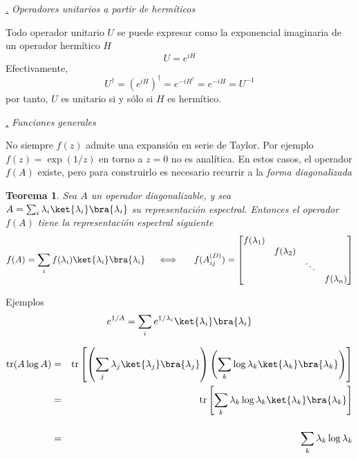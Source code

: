 \documentclass[a4paper,11pt]{book} %
\newtheorem{teorema_contador}{Teorema}
\newcommand{\Teorema}[1]{
		\begin{mybox_gray2}{}
			\begin{teorema_contador}
				 #1 
			\end{teorema_contador} 
		\end{mybox_gray2}
	}
\numberwithin{equation}{chapter}
\def\subsubiContadorIt{\par\addtocounter{subsubsection}{1}\underline{\it\thesubsubsection.}\hskip0.5cm \setcounter{subsubsubsectionIt}{0}}
\newcommand{\SubsubiIt}[1]{
		\subsubiContadorIt \textit{#1}
	}
\newcounter{subsubsubsectionIt}[subsubsection]
\begin{document}
			\SubsubiIt{Operadores unitarios a partir de hermíticos}

Todo operador unitario $U$ se puede expresar como la exponencial imaginaria de un operador hermítico $H$
	\begin{equation}
	U = e^{i H}
	\end{equation}
Efectivamente, 
	\begin{equation}
	U^\dagger = \left(e^{i H}\right)^\dagger = e^{-i H^\dagger} = e^{-i H}=U^{-1}
	\end{equation}
por tanto, $U$ es unitario si y sólo si $H$ es hermítico.


			\SubsubiIt{Funciones generales}

No siempre $f(z)$ admite una expansión en serie de Taylor. Por ejemplo $f(z) = \exp(1/z)$ en torno a $z=0$ no es analítica. En estos casos, el operador $f(A)$ existe, pero para construirlo es necesario recurrir a la \textit{forma diagonalizada}

	\Teorema{\label{teorema_formalismo_funciones_sobre_operador_diagonal}
	Sea $A$ un operador diagonalizable, y sea $A= \sum_i \lambda_i \ket{\lambda_i}\bra{\lambda_i}$ su representación espectral. Entonces el operador $f(A)$ tiene la representación espectral siguiente  
	\begin{equation}
	f(A) = \sum_i f(\lambda_i) \ket{\lambda_i}\bra{\lambda_i}~~~~\Longleftrightarrow~~~~~
f(A^{(D)}_{ij}) = \begin{bmatrix} f(\lambda_1)& &  & \\ & f(\lambda_2) & &  \\ & & \ddots & \\ & & & f(\lambda_n)
\end{bmatrix}
	\end{equation}
	}

	\begin{mybox_green}{Ejemplos}
	$$e^{1/A} = \sum_i e^{1/\lambda_i} \ket{\lambda_i}\bra{\lambda_i}$$
	
	\begin{eqnarray*}
	{\rm tr}(A \log A) &=& {\rm tr}\left[\left(\sum_j \lambda_j \ket{\lambda_j}\bra{\lambda_j}\right)\left(\sum_k\log \lambda_k \ket{\lambda_k}\bra{\lambda_k}\right)\right]\nonumber\\
	&=& {\rm tr}\left[\sum_k \lambda_k \log\lambda_k \ket{\lambda_k}\bra{\lambda_k} \right] \\
	&=& \sum_k \lambda_k \log \lambda_k \rule{0mm}{8mm}
	\end{eqnarray*}
	\end{mybox_green}
\end{document}
